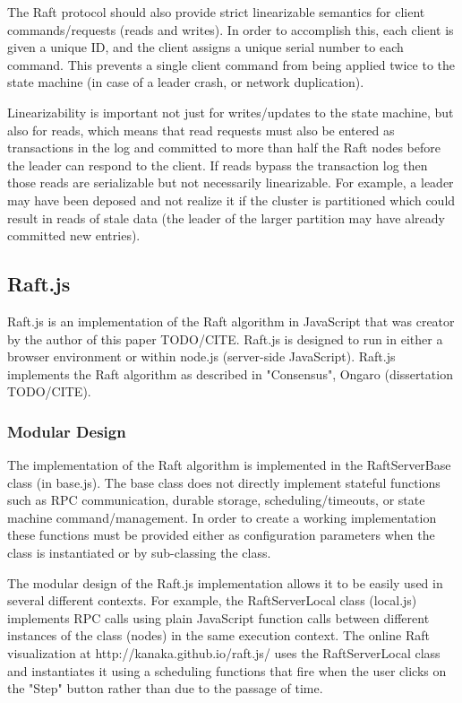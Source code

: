 \documentclass{acmtog} %
\begin{document}
The Raft protocol should also provide strict linearizable semantics for
client commands/requests (reads and writes). In order to accomplish
this, each client is given a unique ID, and the client assigns
a unique serial number to each command. This prevents a single client
command from being applied twice to the state machine (in case of
a leader crash, or network duplication).

Linearizability is important not just for writes/updates to the state
machine, but also for reads, which means that read requests must also
be entered as transactions in the log and committed to more than half
the Raft nodes before the leader can respond to the client. If reads
bypass the transaction log then those reads are serializable but not
necessarily linearizable. For example, a leader may have been deposed
and not realize it if the cluster is partitioned which could result in
reads of stale data (the leader of the larger partition may have
already committed new entries).

\subsection{Raft.js}

Raft.js is an implementation of the Raft algorithm in JavaScript that
was creator by the author of this paper TODO/CITE. Raft.js is designed
to run in either a browser environment or within node.js (server-side
JavaScript). Raft.js implements the Raft algorithm as described in
"Consensus", Ongaro (dissertation TODO/CITE).

\subsubsection{Modular Design}

The implementation of the Raft algorithm is implemented in the
RaftServerBase class (in base.js). The base class does not directly
implement stateful functions such as RPC communication, durable
storage, scheduling/timeouts, or state machine command/management. In
order to create a working implementation these functions must be
provided either as configuration parameters when the class is
instantiated or by sub-classing the class.

The modular design of the Raft.js implementation allows it to be easily
used in several different contexts. For example, the RaftServerLocal
class (local.js) implements RPC calls using plain JavaScript function
calls between different instances of the class (nodes) in the same
execution context. The online Raft visualization at
http://kanaka.github.io/raft.js/ uses the RaftServerLocal class and
instantiates it using a scheduling functions that fire when the user
clicks on the "Step" button rather than due to the passage of time.
\end{document}
